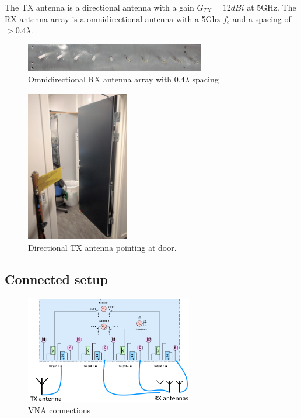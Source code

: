 The TX antenna is a directional antenna with a gain $G_{TX}=12dBi$ at 5GHz.
The RX antenna array is a omnidirectional antenna with a 5Ghz $f_c$ and a spacing of $>0.4 \lambda$.
\begin{figure}[H]
\centering
\includegraphics[width=0.7\textwidth]{pictures/Measurement/antenna_array.jpg}
    \caption{Omnidirectional RX antenna array with $0.4 \lambda$ spacing}
\end{figure}
\begin{figure}[H]
\centering
\includegraphics[width=0.4\textwidth]{pictures/Measurement/antenna_door.jpg}
\caption{Directional TX antenna pointing at door.}
\end{figure}


\label{equip}
\subsection{Connected setup}

\begin{figure}[H]
\centering
\includegraphics[width=0.65\textwidth]{figures/Gimp_figures/4portVNA.png}
\caption{VNA connections}
\label{connection_diagram}
\end{figure}

